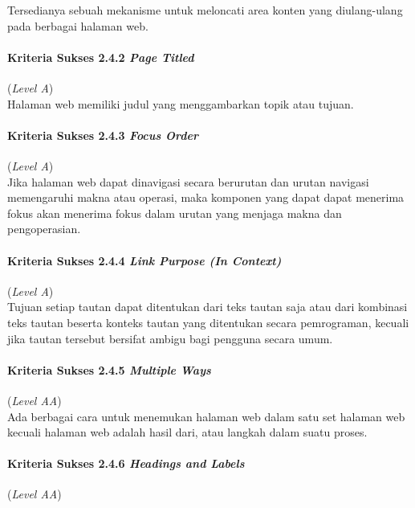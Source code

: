 Tersedianya sebuah mekanisme untuk meloncati area konten yang diulang-ulang pada berbagai halaman web.

\paragraph{Kriteria Sukses 2.4.2 \textit{Page Titled}}
\label{subsec:kriteria_2.4.2}
(\textit{Level A}) \\

Halaman web memiliki judul yang menggambarkan topik atau tujuan.

\paragraph{Kriteria Sukses 2.4.3 \textit{Focus Order}}
\label{subsec:kriteria_2.4.3}
(\textit{Level A}) \\

Jika halaman web dapat dinavigasi secara berurutan dan urutan navigasi memengaruhi makna atau operasi, maka komponen yang dapat dapat menerima fokus akan menerima fokus dalam urutan yang menjaga makna dan pengoperasian.

\paragraph{Kriteria Sukses 2.4.4 \textit{Link Purpose (In Context)}}
\label{subsec:kriteria_2.4.4}
(\textit{Level A}) \\

Tujuan setiap tautan dapat ditentukan dari teks tautan saja atau dari kombinasi teks tautan beserta konteks tautan yang ditentukan secara pemrograman, kecuali jika tautan tersebut bersifat ambigu bagi pengguna secara umum.

\paragraph{Kriteria Sukses 2.4.5 \textit{Multiple Ways}}
\label{subsec:kriteria_2.4.5}
(\textit{Level AA}) \\

Ada berbagai cara untuk menemukan halaman web dalam satu set halaman web kecuali halaman web adalah hasil dari, atau langkah dalam suatu proses.

\paragraph{Kriteria Sukses 2.4.6 \textit{Headings and Labels}}
\label{subsec:kriteria_2.4.6}
(\textit{Level AA}) \\

